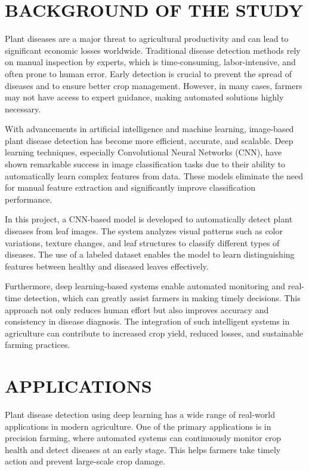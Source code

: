 \documentclass[12pt]{report}
\begin{document}
\section{BACKGROUND OF THE STUDY}
Plant diseases are a major threat to agricultural productivity and can lead to significant economic losses worldwide. Traditional disease detection methods rely on manual inspection by experts, which is time-consuming, labor-intensive, and often prone to human error. Early detection is crucial to prevent the spread of diseases and to ensure better crop management. However, in many cases, farmers may not have access to expert guidance, making automated solutions highly necessary.

With advancements in artificial intelligence and machine learning, image-based plant disease detection has become more efficient, accurate, and scalable. Deep learning techniques, especially Convolutional Neural Networks (CNN), have shown remarkable success in image classification tasks due to their ability to automatically learn complex features from data. These models eliminate the need for manual feature extraction and significantly improve classification performance.

In this project, a CNN-based model is developed to automatically detect plant diseases from leaf images. The system analyzes visual patterns such as color variations, texture changes, and leaf structures to classify different types of diseases. The use of a labeled dataset enables the model to learn distinguishing features between healthy and diseased leaves effectively.

Furthermore, deep learning-based systems enable automated monitoring and real-time detection, which can greatly assist farmers in making timely decisions. This approach not only reduces human effort but also improves accuracy and consistency in disease diagnosis. The integration of such intelligent systems in agriculture can contribute to increased crop yield, reduced losses, and sustainable farming practices.

\section{APPLICATIONS}
Plant disease detection using deep learning has a wide range of real-world applications in modern agriculture. One of the primary applications is in precision farming, where automated systems can continuously monitor crop health and detect diseases at an early stage. This helps farmers take timely action and prevent large-scale crop damage.
\end{document}
